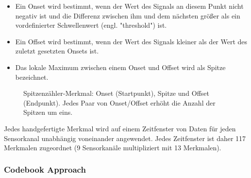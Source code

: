 \begin{itemize} %
  \item Ein Onset wird bestimmt, wenn der Wert des Signals an diesem Punkt nicht negativ ist und die Differenz zwischen ihm und dem nächsten größer als ein vordefinierter Schwellenwert (engl. "threshold") ist.

  \item Ein Offset wird bestimmt, wenn der Wert des Signals kleiner als der Wert des zuletzt gesetzten Onsets ist.

  \item Das lokale Maximum zwischen einem Onset und Offset wird als Spitze bezeichnet.
\end{itemize} \vspace{0.2cm}


\begin{figure}[h] 
\caption[Spitzenzähler-Merkmal]{Spitzenzähler-Merkmal: Onset (Startpunkt), Spitze und Offset (Endpunkt). Jedes Paar von Onset/Offset erhöht die Anzahl der Spitzen um eins.} 
\label{fig:peaks} \end{figure} \vspace{0.5cm}


Jedes handgefertigte Merkmal wird auf einem Zeitfenster von Daten für jeden Sensorkanal unabhängig voneinander angewendet. 
Jedes Zeitfenster ist daher 117 Merkmalen zugeordnet (9 Sensorkanäle multipliziert mit 13 Merkmalen). \\





\subsubsection{Codebook Approach} \label{ca-1}


